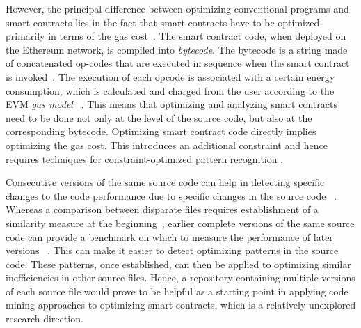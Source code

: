 \documentclass[10pt,conference]{IEEEtran}
\begin{document}
	However, the principal difference between optimizing conventional programs and smart contracts lies in the fact that smart contracts have to be optimized primarily in terms of the gas cost~\cite{superoptimization}. The smart contract code, when deployed on the Ethereum network, is compiled into \textit{bytecode}. The bytecode is a string made of concatenated op-codes that are executed in sequence when the smart contract is invoked~\cite{wood2019ethereum}. The execution of each opcode is associated with a certain energy consumption, which is calculated and charged from the user according to the EVM \textit{gas model} ~\cite{wood2019ethereum}. This means that optimizing and analyzing smart contracts need to be done not only at the level of the source code, but also at the corresponding bytecode. Optimizing smart contract code directly implies optimizing the gas cost. This introduces an additional constraint and hence requires techniques for constraint-optimized pattern recognition \cite{utilitypattern}.
	
	Consecutive versions of the same source code can help in detecting specific changes to the code performance due to specific changes in the source code ~\cite{softwareversion}. Whereas a comparison between disparate files requires establishment of a similarity measure at the beginning~\cite{simsimilarity}, earlier complete versions of the same source code can provide a benchmark on which to measure the performance of later versions ~\cite{softwareversion}. This can make it easier to detect optimizing patterns in the source code. These patterns, once established, can then be applied to optimizing similar inefficiencies in other source files. Hence, a repository containing multiple versions of each source file would prove to be helpful as a starting point in applying code mining approaches to optimizing smart contracts, which is a relatively unexplored research direction.
	
\end{document}

